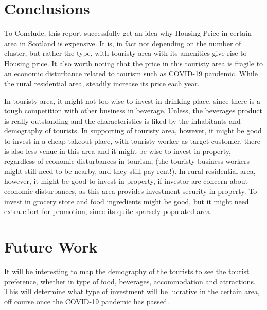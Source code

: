 \documentclass{homeworg}
\begin{document}
\section{Conclusions}
To Conclude, this report successfully get an idea why Housing Price in certain area in Scotland is expensive. It is, in fact not depending on the number of cluster, but rather the type, with touristy area with its amenities give rise to Housing price. It also worth noting that the price in this touristy area is fragile to an economic disturbance related to tourism such as COVID-19 pandemic. While the rural residential area, steadily increase its price each year.\par
In touristy area, it might not too wise to invest in drinking place, since there is a tough competition with other business in beverage. Unless, the beverages product is really outstanding and the characteristics is liked by the inhabitants and demography of tourists. In supporting of touristy area, however, it might be good to invest in a cheap takeout place, with touristy worker as target customer, there is also less venue in this area and it might be wise to invest in property, regardless of economic disturbances in tourism, (the touristy business workers might still need to be nearby, and they still pay rent!). In rural residential area, however, it might be good to invest in property, if investor are concern about economic disturbances, as this area provides investment security in property. To invest in grocery store and food ingredients might be good, but it might need extra effort for promotion, since its quite sparsely populated area. \par
\section{Future Work}
It will be interesting to map the demography of the tourists to see the tourist preference, whether in type of food, beverages, accommodation and attractions. This will determine what type of investment will be lucrative in the certain area, off course once the COVID-19 pandemic has passed. 
\end{document}
